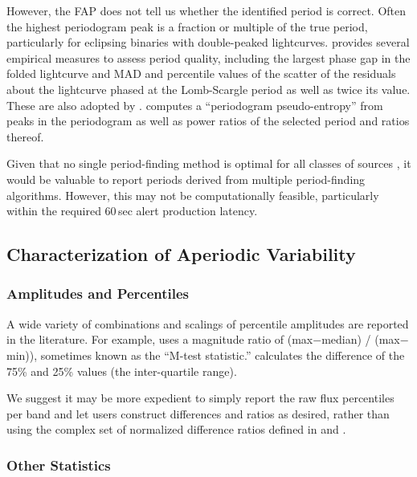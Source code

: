 \documentclass[DM,authoryear,toc]{lsstdoc}
\begin{document}
However, the FAP does not tell us whether the identified period is correct.
Often the highest periodogram peak is a fraction or multiple of the true period, particularly for eclipsing binaries with double-peaked lightcurves.
\citet{Dubath:11:VariableClassification} provides several empirical measures to assess period quality, including the largest phase gap in the folded lightcurve and MAD and percentile values of the scatter of the residuals about the lightcurve phased at the Lomb-Scargle period as well as twice its value.  
These are also adopted by \citep{Richards:12:ASASCatalog}. 
\citet{Sanchez-Saez:21:AlertClassification} computes a ``periodogram pseudo-entropy'' from peaks in the periodogram as well as power ratios of the selected period and ratios thereof.


Given that no single period-finding method is optimal for all classes of sources \citep{Graham:13:PeriodFindingComparison}, it would be valuable to report periods derived from multiple period-finding algorithms.
However, this may not be computationally feasible, particularly within the required 60\,sec alert production latency.



\subsection{Characterization of Aperiodic Variability}

\subsubsection{Amplitudes and Percentiles}

A wide variety of combinations and scalings of percentile amplitudes are reported in the literature.
For example, \citet{Kinemuchi:06:RRLyrNSVS} uses a magnitude ratio of (max$-$median) / (max$-$min)), sometimes known as the ``M-test statistic.''
\citet{Kim:16:UPSILoN} calculates the difference of the 75\% and 25\% values (the inter-quartile range).


We suggest it may be more expedient to simply report the raw flux percentiles per band and let users construct differences and ratios as desired, rather than using the complex set of normalized difference ratios defined in \citet{2011ApJ...733...10R} and .

\subsubsection{Other Statistics} \label{sec:other-stats}
\end{document}
